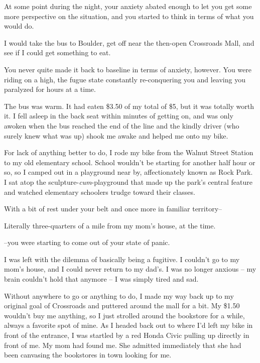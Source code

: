 \begin{paracol}{2}
\begin{leftcolumn}
\begin{ally}
At some point during the night, your anxiety abated enough to let you get some more perspective on the situation, and you started to think in terms of what you would do.
\end{ally}
I would take the bus to Boulder, get off near the then-open Crossroads Mall, and see if I could get something to eat.

\begin{ally}
You never quite made it back to baseline in terms of anxiety, however. You were riding on a high, the fugue state constantly re-conquering you and leaving you paralyzed for hours at a time.
\end{ally}
The bus was warm. It had eaten \$3.50 of my total of \$5, but it was totally worth it. I fell asleep in the back seat within minutes of getting on, and was only awoken when the bus reached the end of the line and the kindly driver (who surely knew what was up) shook me awake and helped me onto my bike.

For lack of anything better to do, I rode my bike from the Walnut Street Station to my old elementary school. School wouldn't be starting for another half hour or so, so I camped out in a playground near by, affectionately known as Rock Park. I sat atop the sculpture-\emph{cum}-playground that made up the park's central feature and watched elementary schoolers trudge toward their classes.

\begin{ally}
With a bit of rest under your belt and once more in familiar territory--
\end{ally}
Literally three-quarters of a mile from my mom's house, at the time.

\begin{ally}
--you were starting to come out of your state of panic.
\end{ally}
I was left with the dilemma of basically being a fugitive. I couldn't go to my mom's house, and I could never return to my dad's. I was no longer anxious -- my brain couldn't hold that anymore -- I was simply tired and sad.

Without anywhere to go or anything to do, I made my way back up to my original goal of Crossroads and puttered around the mall for a bit. My \$1.50 wouldn't buy me anything, so I just strolled around the bookstore for a while, always a favorite spot of mine. As I headed back out to where I'd left my bike in front of the entrance, I was startled by a red Honda Civic pulling up directly in front of me. My mom had found me. She admitted immediately that she had been canvasing the bookstores in town looking for me.


\end{leftcolumn}
\end{paracol}
